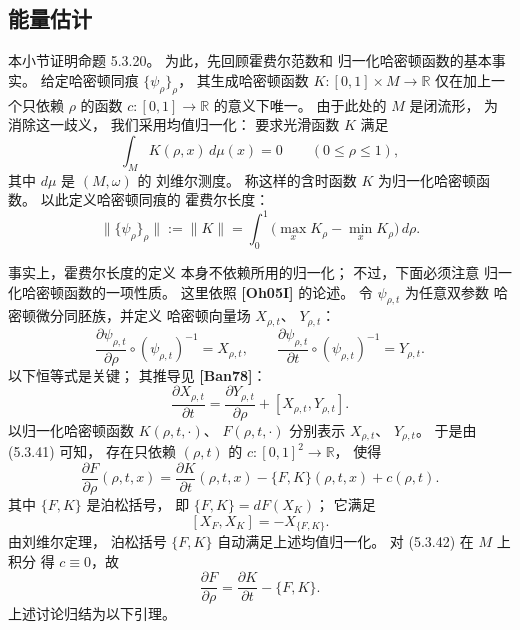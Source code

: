 
\subsection{能量估计}
\label{subsec:5-3-5}

本小节证明命题 5.3.20。
为此，先回顾霍费尔范数和
归一化哈密顿函数的基本事实。
给定哈密顿同痕
$\{\psi_\rho\}_\rho$，
其生成哈密顿函数
$K\colon[0,1]\times M\to\mathbb R$
仅在加上一个只依赖
$\rho$ 的函数
$c\colon[0,1]\to\mathbb R$
的意义下唯一。
由于此处的 $M$ 是闭流形，
为消除这一歧义，
我们采用均值归一化：
要求光滑函数 $K$ 满足
\[
\int_M K(\rho,x)\,d\mu(x)=0
\qquad(0\le\rho\le1),
\]
其中 $d\mu$ 是 $(M,\omega)$ 的
刘维尔测度。
称这样的含时函数 $K$
为归一化哈密顿函数。
以此定义哈密顿同痕的
霍费尔长度：
\begin{equation}
\bigl\|\{\psi_\rho\}_\rho\bigr\|
:=\|K\|
=\int_0^1
\bigl(\max_x K_\rho-\min_x K_\rho\bigr)
\,d\rho.
\tag{5.3.40}\label{eq:5-3-40}
\end{equation}

事实上，霍费尔长度的定义
本身不依赖所用的归一化；
不过，下面必须注意
归一化哈密顿函数的一项性质。
这里依照 \textbf{[Oh05I]}
的论述。
令 $\psi_{\rho,t}$ 为任意双参数
哈密顿微分同胚族，并定义
哈密顿向量场 $X_{\rho,t}$、
$Y_{\rho,t}$：
\[
\frac{\partial\psi_{\rho,t}}{\partial\rho}
\circ(\psi_{\rho,t})^{-1}=X_{\rho,t},
\qquad
\frac{\partial\psi_{\rho,t}}{\partial t}
\circ(\psi_{\rho,t})^{-1}=Y_{\rho,t}.
\]
以下恒等式是关键；
其推导见 \textbf{[Ban78]}：
\begin{equation}
\frac{\partial X_{\rho,t}}{\partial t}
=\frac{\partial Y_{\rho,t}}{\partial\rho}
+[X_{\rho,t},Y_{\rho,t}].
\tag{5.3.41}\label{eq:5-3-41}
\end{equation}
以归一化哈密顿函数
$K(\rho,t,\cdot)$、
$F(\rho,t,\cdot)$
分别表示 $X_{\rho,t}$、
$Y_{\rho,t}$。
于是由 (5.3.41) 可知，
存在只依赖 $(\rho,t)$ 的
$c\colon[0,1]^2\to\mathbb R$，
使得
\begin{equation}
\frac{\partial F}{\partial\rho}
(\rho,t,x)
=\frac{\partial K}{\partial t}
(\rho,t,x)
-\{F,K\}(\rho,t,x)+c(\rho,t).
\tag{5.3.42}\label{eq:5-3-42}
\end{equation}
其中 $\{F,K\}$ 是泊松括号，
即
$\{F,K\}=dF(X_K)$；
它满足
\[
[X_F,X_K]=-X_{\{F,K\}}.
\]
由刘维尔定理，
泊松括号 $\{F,K\}$
自动满足上述均值归一化。
对 (5.3.42) 在 $M$ 上积分
得 $c\equiv0$，故
\begin{equation}
\frac{\partial F}{\partial\rho}
=\frac{\partial K}{\partial t}
-\{F,K\}.
\tag{5.3.43}\label{eq:5-3-43}
\end{equation}
上述讨论归结为以下引理。


